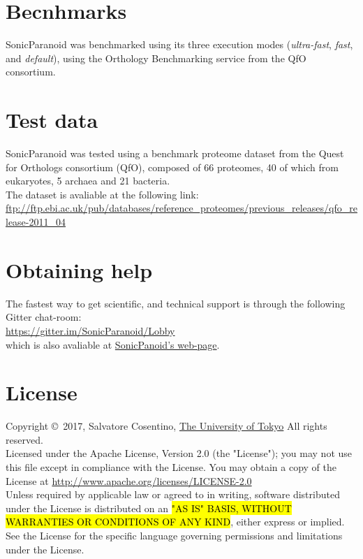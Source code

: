 \documentclass[12pt]{article} %
\begin{document}

\section{Becnhmarks} %
SonicParanoid was benchmarked using its three execution modes (\textit{ultra-fast}, \textit{fast}, and \textit{default}), using the Orthology Benchmarking service from the QfO consortium.

\section{Test data}
SonicParanoid was tested using a benchmark proteome dataset from the Quest for Orthologs consortium (QfO), composed of 66 proteomes, 40 of which from eukaryotes, 5 archaea and 21 bacteria.\\
The dataset is avaliable at the following link:\\
\href{ftp://ftp.ebi.ac.uk/pub/databases/reference_proteomes/previous_releases/qfo_release-2011_04}{ftp://ftp.ebi.ac.uk/pub/databases/reference\_proteomes/previous\_releases/qfo\_release-2011\_04}

\section{Obtaining help}
The fastest way to get scientific, and technical support is through the following Gitter chat-room:\\
\href{https://gitter.im/SonicParanoid/Lobby}{https://gitter.im/SonicParanoid/Lobby}\\
which is also avaliable at \href{http://iwasakilab.bs.s.u-tokyo.ac.jp/sonicparanoid/}{SonicPanoid's web-page}.

\section{License}
Copyright \copyright\ 2017, Salvatore Cosentino, \href{http://www.u-tokyo.ac.jp}{The University of Tokyo} All rights reserved.\\
Licensed under the Apache License, Version 2.0 (the "License"); you may not use this file except in compliance with the License. You may obtain a copy of the License at \href{http://www.apache.org/licenses/LICENSE-2.0}{http://www.apache.org/licenses/LICENSE-2.0}\\
Unless required by applicable law or agreed to in writing, software distributed under the License is distributed on an \hl{"AS IS" BASIS, WITHOUT WARRANTIES OR CONDITIONS OF ANY KIND}, either express or implied. See the License for the specific language governing permissions and limitations under the License.
\end{document}
